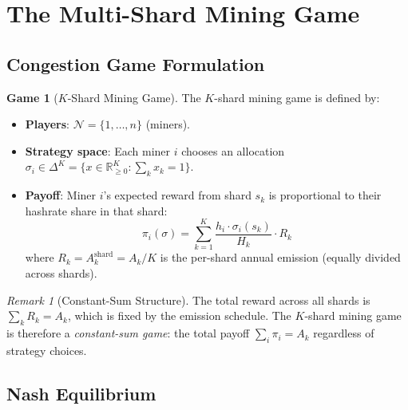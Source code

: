 \documentclass[11pt,a4paper]{article}
\theoremstyle{definition}
\newtheorem{game}[theorem]{Game}
\theoremstyle{remark}
\newtheorem{remark}[theorem]{Remark}
\newcommand{\payoff}{\pi}
\newcommand{\strategy}{\sigma}
\newcommand{\Players}{\mathcal{N}}
\newcommand{\hashrate}{h}
\newcommand{\Hashrate}{H}
\newcommand{\reward}{R}
\newcommand{\R}{\mathbb{R}}
\begin{document}
\section{The Multi-Shard Mining Game}\label{sec:shard-game}

\subsection{Congestion Game Formulation}

\begin{game}[$K$-Shard Mining Game]\label{game:shard}
The $K$-shard mining game is defined by:
\begin{itemize}[nosep]
  \item \textbf{Players}: $\Players = \{1, \ldots, n\}$ (miners).
  \item \textbf{Strategy space}: Each miner $i$ chooses an allocation
    $\strategy_i \in \Delta^K = \{x \in \R^K_{\geq 0} : \sum_k x_k = 1\}$.
  \item \textbf{Payoff}: Miner $i$'s expected reward from shard $s_k$ is
    proportional to their hashrate share in that shard:
    \begin{equation}\label{eq:shard-payoff}
      \payoff_i(\strategy) = \sum_{k=1}^{K}
        \frac{\hashrate_i \cdot \strategy_i(s_k)}{\Hashrate_k} \cdot
        \reward_k
    \end{equation}
    where $\reward_k = A_k^{\text{shard}} = A_k / K$ is the per-shard
    annual emission (equally divided across shards).
\end{itemize}
\end{game}

\begin{remark}[Constant-Sum Structure]\label{rem:constant-sum}
The total reward across all shards is $\sum_k \reward_k = A_k$,
which is fixed by the emission schedule.
The $K$-shard mining game is therefore a \emph{constant-sum game}:
the total payoff $\sum_i \payoff_i = A_k$ regardless of strategy
choices.
\end{remark}

\subsection{Nash Equilibrium}
\end{document}
